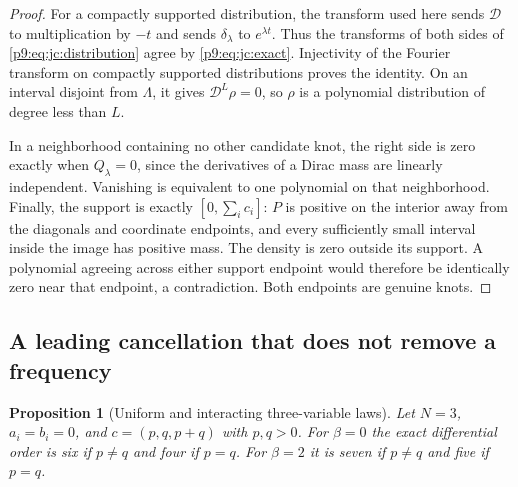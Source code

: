 \documentclass[11pt,a4paper]{article}
\newtheorem{proposition}[theorem]{Proposition}
\theoremstyle{definition}
\theoremstyle{remark}
\numberwithin{equation}{section}
\begin{document}
\begin{proof}
For a compactly supported distribution, the transform used here
sends $\mathcal D$ to multiplication by $-t$ and sends
$\delta_\lambda$ to $e^{\lambda t}$.  Thus the transforms of both
sides of \eqref{p9:eq:jc:distribution} agree by
\eqref{p9:eq:jc:exact}.  Injectivity of the Fourier transform on
compactly supported distributions proves the identity.  On an
interval disjoint from $\Lambda$, it gives $\mathcal D^L\rho=0$,
so $\rho$ is a polynomial distribution of degree less than $L$.

In a neighborhood containing no other candidate knot, the right
side is zero exactly when $Q_\lambda=0$, since the derivatives of
a Dirac mass are linearly independent.  Vanishing is equivalent to
one polynomial on that neighborhood.  Finally, the support is
exactly $[0,\sum_i c_i]$: $P$ is positive on the interior away from
the diagonals and coordinate endpoints, and every sufficiently
small interval inside the image has positive mass.  The density is
zero outside its support.  A polynomial agreeing across either
support endpoint would therefore be identically zero near that
endpoint, a contradiction.  Both endpoints are genuine knots.
\end{proof}

\subsection{A leading cancellation that does not remove a frequency}

\begin{proposition}[Uniform and interacting three-variable laws]
\label{p9:prop:jc:three}
Let $N=3$, $a_i=b_i=0$, and $c=(p,q,p+q)$ with $p,q>0$.
For $\beta=0$ the exact differential order is six if $p\ne q$ and
four if $p=q$.  For $\beta=2$ it is seven if $p\ne q$ and five if
$p=q$.
\end{proposition}
\end{document}
